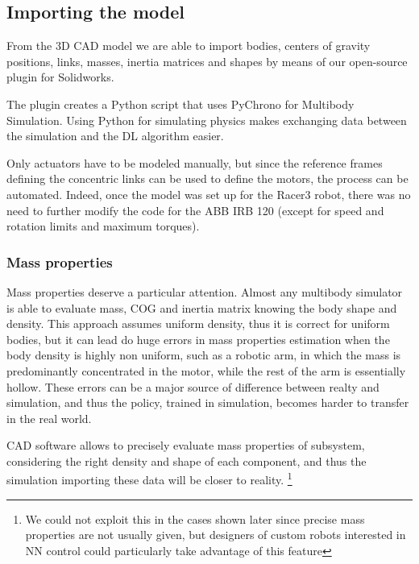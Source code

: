 \documentclass{sig-alternate-05-2015}
\begin{document}
\subsection{Importing the model}
From the 3D CAD model we are able to import bodies, centers of gravity positions, links, masses, inertia matrices and shapes by means of our open-source plugin for Solidworks.

The plugin creates a Python script that uses PyChrono for Multibody Simulation. Using Python for simulating physics makes exchanging data between the simulation and the DL algorithm easier. 

Only actuators have to be modeled manually, but since the reference frames defining the concentric links can be used to define the motors, the process can be automated. Indeed, once the model was set up for the Racer3 robot, there was no need to further modify the code for the ABB IRB 120 (except for speed and rotation limits and maximum torques).
\subsubsection{Mass properties}
Mass properties deserve a particular attention. Almost any multibody simulator is able to evaluate mass, COG and inertia matrix knowing the body shape and density. This approach assumes uniform density, thus it is correct for uniform bodies, but it can lead do huge errors in mass properties estimation when the body density is highly non uniform, such as a robotic arm, in which the mass is predominantly concentrated in the motor, while the rest of the arm is essentially hollow.
These errors can be a major source of difference between realty and simulation, and thus the policy, trained in simulation, becomes harder to transfer in the real world.

CAD software allows to precisely evaluate mass properties of subsystem, considering the right density and shape of each component, and thus the simulation importing these data will be closer to reality. \footnote{We could not exploit this in the cases shown later since precise mass properties are not usually given, but designers of custom robots interested in NN control could particularly take advantage of this feature}

\end{document}
